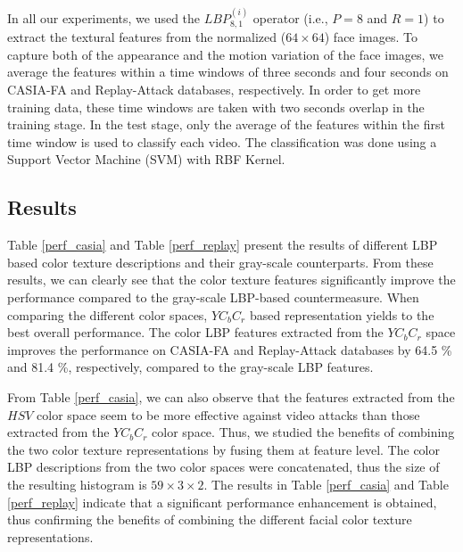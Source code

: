 \documentclass{article}
\begin{document}
In all our experiments, we used the $LBP_{8,1}^{(i)}$ operator (i.e., $P=8$ and $R=1$) to extract the textural features from the normalized ($64 \times 64$)  face images.
To capture both of the appearance and the motion variation of the face images, we average the features within a time windows of three seconds and four seconds on CASIA-FA and Replay-Attack databases, respectively. In order to get more training data, these time windows are taken with  two seconds overlap in the training stage. In the test stage, only the average of the features within the first time window is used to classify each video. The classification was done using a Support Vector Machine \cite{libsvm} (SVM) with RBF Kernel. 
		\vspace{-1mm}
\subsection{Results}
	\vspace{-1mm}
\label{sec:experiments}
 Table \ref{perf_casia} and Table \ref{perf_replay} present the results of different LBP based color texture descriptions and their gray-scale counterparts. From these results, we can clearly see that the color texture features significantly improve the performance compared to the gray-scale LBP-based countermeasure. When comparing the different color spaces, $YC_bC_r$ based representation yields to the best overall performance. The color LBP features extracted from the $YC_bC_r$ space improves the performance on CASIA-FA and Replay-Attack databases by 64.5 \% and 81.4 \%, respectively, compared to the gray-scale LBP features.
			
From Table \ref{perf_casia}, we can also observe that the features extracted from the $HSV$ color space seem to be more effective against video attacks than those extracted from the $YC_bC_r$ color space. Thus,  we studied the benefits of combining the two color texture representations by fusing them at feature level. The color LBP descriptions from the two color spaces were concatenated, thus the size of the resulting histogram is $59 \times 3 \times 2$. The results in Table \ref{perf_casia} and Table \ref{perf_replay} indicate that a significant performance enhancement is obtained, thus confirming the benefits of combining the different facial color texture representations.
\end{document}
